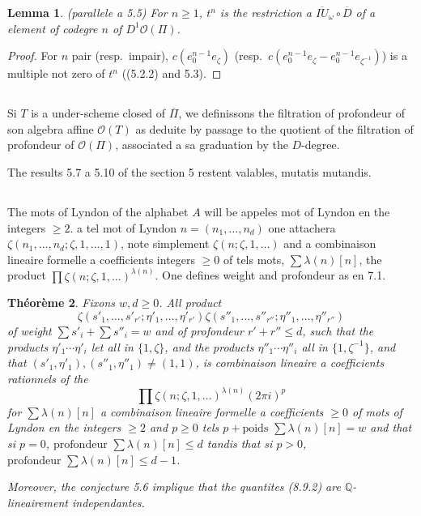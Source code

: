 \documentclass[11pt,a4paper]{article}
\theoremstyle{plain}
\newtheorem{theorem}{Th\'eor\`eme}[section]
\newtheorem{lemma}[theorem]{Lemma}
\theoremstyle{definition}
\newcommand{\Q}{\mathbb{Q}}
\begin{document}
\begin{lemma}\label{lem:8.6} (parallele a 5.5)
For $n \geq 1$, $t^n$ is the restriction a $\overline{IU}_\omega \circ \overline{D}$ of a element of codegre $n$ of $D^1\mathcal{O}(\Pi)$.
\end{lemma}

\begin{proof}
For $n$ pair (resp.~impair), $c(e_0^{n-1}e_\zeta)$ (resp.~$c(e_0^{n-1}e_\zeta - e_0^{n-1}e_{\zeta^{-1}})$) is a multiple not zero of $t^n$ ((5.2.2) and 5.3).
\end{proof}

\subsection{}
Si $T$ is a under-scheme closed of $\overline{\Pi}$, we definissons the filtration of profondeur of son algebra affine $\mathcal{O}(T)$ as deduite by passage to the quotient of the filtration of profondeur of $\mathcal{O}(\Pi)$, associated a sa graduation by the $D$-degree.

The results 5.7 a 5.10 of the section 5 restent valables, mutatis mutandis.

\subsection{}
The mots of Lyndon of the alphabet $A$ will be appeles mot of Lyndon en the integers $\geq 2$. a tel mot of Lyndon $n = (n_1,\ldots,n_d)$ one attachera $\zeta(n_1,\ldots,n_d; \zeta, 1,\ldots,1)$, note simplement $\zeta(n; \zeta, 1, \ldots)$ and a combinaison lineaire formelle a coefficients integers $\geq 0$ of tels mots, $\sum \lambda(n)[n]$, the product $\prod \zeta(n; \zeta, 1, \ldots)^{\lambda(n)}$. One defines weight and profondeur as en 7.1.

\begin{theorem}\label{thm:8.9}
Fixons $w, d \geq 0$. All product
\begin{equation}\label{eq:8.9.1}
\zeta(s'_1,\ldots,s'_{r'}; \eta'_1,\ldots,\eta'_{r'}) \zeta(s''_1,\ldots,s''_{r''}; \eta''_1,\ldots,\eta''_{r''})
\end{equation}
of weight $\sum s'_i + \sum s''_i = w$ and of profondeur $r' + r'' \leq d$, such that the products $\eta'_1 \cdots \eta'_i$ let all in $\{1, \zeta\}$, and the products $\eta''_1 \cdots \eta''_i$ all in $\{1, \zeta^{-1}\}$, and that $(s'_1, \eta'_1), (s''_1, \eta''_1) \neq (1,1)$, is combinaison lineaire a coefficients rationnels of the
\begin{equation}\label{eq:8.9.2}
\prod \zeta(n; \zeta, 1, \ldots)^{\lambda(n)} (2\pi i)^p
\end{equation}
for $\sum \lambda(n)[n]$ a combinaison lineaire formelle a coefficients $\geq 0$ of mots of Lyndon en the integers $\geq 2$ and $p \geq 0$ tels $p + \text{poids } \sum \lambda(n)[n] = w$ and that si $p=0$, $\text{profondeur } \sum \lambda(n)[n] \leq d$ tandis that si $p > 0$, $\text{profondeur } \sum \lambda(n)[n] \leq d-1$.

Moreover, the conjecture 5.6 implique that the quantites (8.9.2) are $\Q$-lineairement independantes.
\end{theorem}
\end{document}
